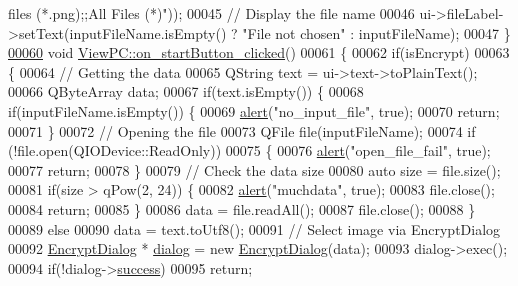 \begin{DoxyCode}
{       files (*.png);;All Files (*)"}));
00045     \textcolor{comment}{// Display the file name}
00046     ui->fileLabel->setText(inputFileName.isEmpty() ? \textcolor{stringliteral}{"File not chosen"} : inputFileName);
00047 \}
\hypertarget{viewpc_8cpp_source.tex_l00060}{}\hyperlink{class_view_p_c_a456d75b7c5d3a089302a576e7359f1f4}{00060} \textcolor{keywordtype}{void} \hyperlink{class_view_p_c_a456d75b7c5d3a089302a576e7359f1f4}{ViewPC::on\_startButton\_clicked}()
00061 \{
00062     \textcolor{keywordflow}{if}(isEncrypt)
00063     \{
00064         \textcolor{comment}{// Getting the data}
00065         QString text = ui->text->toPlainText();
00066         QByteArray data;
00067         \textcolor{keywordflow}{if}(text.isEmpty()) \{
00068             \textcolor{keywordflow}{if}(inputFileName.isEmpty()) \{
00069                 \hyperlink{class_view_p_c_a7c467169467789561078abc9d4fe57bd}{alert}(\textcolor{stringliteral}{"no\_input\_file"}, \textcolor{keyword}{true});
00070                 \textcolor{keywordflow}{return};
00071             \}
00072             \textcolor{comment}{// Opening the file}
00073             QFile file(inputFileName);
00074             \textcolor{keywordflow}{if} (!file.open(QIODevice::ReadOnly))
00075             \{
00076                 \hyperlink{class_view_p_c_a7c467169467789561078abc9d4fe57bd}{alert}(\textcolor{stringliteral}{"open\_file\_fail"}, \textcolor{keyword}{true});
00077                 \textcolor{keywordflow}{return};
00078             \}
00079             \textcolor{comment}{// Check the data size}
00080             \textcolor{keyword}{auto} size = file.size();
00081             \textcolor{keywordflow}{if}(size > qPow(2, 24)) \{
00082                 \hyperlink{class_view_p_c_a7c467169467789561078abc9d4fe57bd}{alert}(\textcolor{stringliteral}{"muchdata"}, \textcolor{keyword}{true});
00083                 file.close();
00084                 \textcolor{keywordflow}{return};
00085             \}
00086             data = file.readAll();
00087             file.close();
00088         \}
00089         \textcolor{keywordflow}{else}
00090             data = text.toUtf8();
00091         \textcolor{comment}{// Select image via EncryptDialog}
00092         \hyperlink{class_encrypt_dialog}{EncryptDialog} * \hyperlink{class_view_p_c_a31abbb470fe329b44e6ffee202b903ca}{dialog} = \textcolor{keyword}{new} \hyperlink{class_encrypt_dialog}{EncryptDialog}(data);
00093         dialog->exec();
00094         \textcolor{keywordflow}{if}(!dialog->\hyperlink{class_encrypt_dialog_ada4900bcd40894d9c098c65aa4066ac9}{success})
00095             \textcolor{keywordflow}{return};

\end{DoxyCode}
